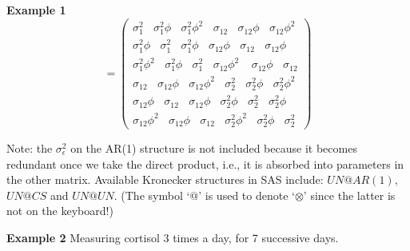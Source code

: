 \documentclass[
  9pt,
  ignorenonframetext,
]{beamer}
\begin{document}
\begin{frame}{}
\begin{block}{\textbf{Example 1}}
\[
= \begin{pmatrix}
\sigma_1^2 \ \ \ \ \sigma_1^2 \phi \ \ \ \ \sigma_1^2 \phi^2  \ \ \ \ \sigma_{12}\ \ \ \ \sigma_{12}\phi \ \ \ \ \sigma_{12}\phi^2 \\ 
\sigma_1^2 \phi \ \ \ \ \sigma_1^2 \ \ \ \ \sigma_1^2 \phi \ \ \ \ \sigma_{12}\phi \ \ \ \ \sigma_{12}\ \ \ \ \sigma_{12}\phi \\ 
\sigma_1^2 \phi^2 \ \ \ \ \sigma_1^2 \phi \ \ \ \ \sigma_1^2 \ \ \ \ \sigma_{12}\phi^2 \ \ \ \ \ \sigma_{12}\phi \ \ \ \ \sigma_{12}\\ 
\sigma_{12}\ \ \ \ \sigma_{12}\phi \ \ \ \ \sigma_{12}\phi^2 \ \ \ \ \sigma_2^2 \ \ \ \ \sigma_2^2 \phi \ \ \ \ \sigma_2^2 \phi^2 \\ 
\sigma_{12}\phi \ \ \ \ \sigma_{12}\ \ \ \ \sigma_{12}\phi \ \ \ \ \sigma_2^2 \phi \ \ \ \ \sigma_2^2 \ \ \ \ \sigma_2^2 \phi \\ 
\sigma_{12}\phi^2 \ \ \ \ \sigma_{12}\phi \ \ \ \ \sigma_{12}\ \ \ \ \sigma_2^2 \phi^2 \ \ \ \ \sigma_2^2 \phi \ \ \ \ \sigma_2^2
\end{pmatrix} 
\]
\end{block}
\end{frame}

\begin{frame}{}
\protect\hypertarget{section-2}{}
Note: the \(\sigma_\epsilon^2\) on the AR(1) structure is not included
because it becomes redundant once we take the direct product, i.e., it
is absorbed into parameters in the other matrix. Available Kronecker
structures in SAS include: \(UN @ AR(1)\), \(UN @ CS\) and \(UN @ UN\).
(The symbol `\(@\)' is used to denote `\(\otimes\)' since the latter is
not on the keyboard!)

\begin{block}{\textbf{Example 2}}
\protect\hypertarget{example-2}{}
Measuring cortisol 3 times a day, for 7 successive days.

\vspace{\baselineskip}
\vspace{\baselineskip}
\vspace{\baselineskip}
\vspace{\baselineskip}
\vspace{\baselineskip}
\vspace{\baselineskip}
\vspace{\baselineskip}
\vspace{\baselineskip}
\vspace{\baselineskip}
\vspace{\baselineskip}
\end{block}
\end{frame}
\end{document}
